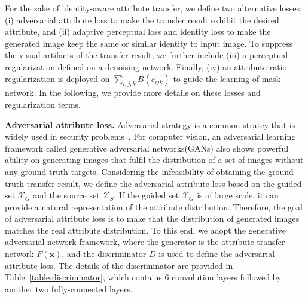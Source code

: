 \documentclass[journal]{IEEEtran}
\begin{document}
For the sake of identity-aware attribute transfer, we define two alternative losses: (i) adversarial attribute loss to make the transfer result exhibit the desired attribute, and
(ii) adaptive perceptual loss and identity loss to make the generated image keep the same or similar identity to input image.
To suppress the visual artifacts of the transfer result, we further include (iii) a perceptual regularization defined on a denoising network.
Finally, (iv) an attribute ratio regularization is deployed on $\sum_{i,j,k} B(e_{ijk})$ to guide the learning of mask network.
In the following, we provide more details on these losses and regularization terms.





\textbf{Adversarial attribute loss.}\quad
Adversarial strategy is a common stratey that is widely used in security problems~\cite{garnaev2016security,zhang2016adversarial}. For computer vision, an adversarial learning framework called generative adversarial networks(GANs) also shows powerful ability on generating images that fulfil the distribution of a set of images without any ground truth targets. 
Considering the infeasibility of obtaining the ground truth transfer result, we define the adversarial attribute loss based on the guided set $\mathcal{X}_G$ and the source set $\mathcal{X}_S$.
If the guided set $\mathcal{X}_G$ is of large scale, it can provide a natural representation of the attribute distribution.
Therefore, the goal of adversarial attribute loss is to make that the distribution of generated images matches the real attribute distribution.
To this end, we adopt the generative adversarial network framework, where the generator is the attribute transfer network $F(\mathbf{x})$,
and the discriminator $D$ is used to define the adversarial attribute loss. The details of the discriminator are provided in Table~\ref{table:discriminator}, which contains 6 convolution layers followed by another two fully-connected layers.
\end{document}
